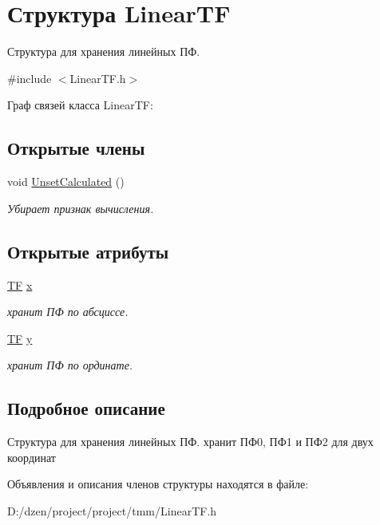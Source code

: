 \hypertarget{struct_linear_t_f}{
\section{Структура LinearTF}
\label{struct_linear_t_f}
}


Структура для хранения линейных ПФ.  




{\ttfamily \#include $<$LinearTF.h$>$}



Граф связей класса LinearTF:
\subsection*{Открытые члены}
\begin{DoxyCompactItemize}
\item 
\hypertarget{struct_linear_t_f_aac5409d7f999c4d88ac48e06b939dabc}{
void \hyperlink{struct_linear_t_f_aac5409d7f999c4d88ac48e06b939dabc}{UnsetCalculated} ()}
\label{struct_linear_t_f_aac5409d7f999c4d88ac48e06b939dabc}

\begin{DoxyCompactList}\small\item\em Убирает признак вычисления. \item\end{DoxyCompactList}\end{DoxyCompactItemize}
\subsection*{Открытые атрибуты}
\begin{DoxyCompactItemize}
\item 
\hypertarget{struct_linear_t_f_a576ad4e197e4e5836d25dfe6464a9ccd}{
\hyperlink{struct_t_f}{TF} \hyperlink{struct_linear_t_f_a576ad4e197e4e5836d25dfe6464a9ccd}{x}}
\label{struct_linear_t_f_a576ad4e197e4e5836d25dfe6464a9ccd}

\begin{DoxyCompactList}\small\item\em хранит ПФ по абсциссе. \item\end{DoxyCompactList}\item 
\hypertarget{struct_linear_t_f_a047ad135a9f04c7e835257ed58aa032c}{
\hyperlink{struct_t_f}{TF} \hyperlink{struct_linear_t_f_a047ad135a9f04c7e835257ed58aa032c}{y}}
\label{struct_linear_t_f_a047ad135a9f04c7e835257ed58aa032c}

\begin{DoxyCompactList}\small\item\em хранит ПФ по ординате. \item\end{DoxyCompactList}\end{DoxyCompactItemize}


\subsection{Подробное описание}
Структура для хранения линейных ПФ. хранит ПФ0, ПФ1 и ПФ2 для двух координат 

Объявления и описания членов структуры находятся в файле:\begin{DoxyCompactItemize}
\item 
D:/dzen/project/project/tmm/LinearTF.h\end{DoxyCompactItemize}
